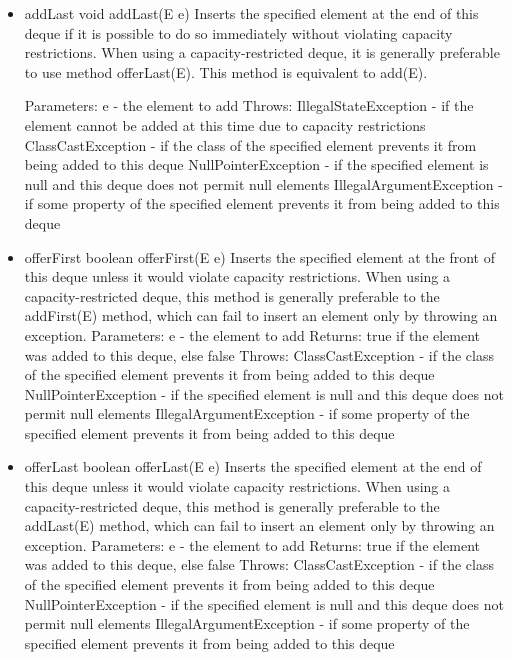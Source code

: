 \documentclass{book}
\begin{document}
\begin{itemize} 
	\item addLast
	void addLast(E e)
	Inserts the specified element at the end of this deque if it is possible to do so immediately without violating capacity restrictions. When using a capacity-restricted deque, it is generally preferable to use method offerLast(E).
	This method is equivalent to add(E).
	
	Parameters:
	e - the element to add
	Throws:
	IllegalStateException - if the element cannot be added at this time due to capacity restrictions
	ClassCastException - if the class of the specified element prevents it from being added to this deque
	NullPointerException - if the specified element is null and this deque does not permit null elements
	IllegalArgumentException - if some property of the specified element prevents it from being added to this deque
	
	\item offerFirst
	boolean offerFirst(E e)
	Inserts the specified element at the front of this deque unless it would violate capacity restrictions. When using a capacity-restricted deque, this method is generally preferable to the addFirst(E) method, which can fail to insert an element only by throwing an exception.
	Parameters:
	e - the element to add
	Returns:
	true if the element was added to this deque, else false
	Throws:
	ClassCastException - if the class of the specified element prevents it from being added to this deque
	NullPointerException - if the specified element is null and this deque does not permit null elements
	IllegalArgumentException - if some property of the specified element prevents it from being added to this deque
	
	\item offerLast
	boolean offerLast(E e)
	Inserts the specified element at the end of this deque unless it would violate capacity restrictions. When using a capacity-restricted deque, this method is generally preferable to the addLast(E) method, which can fail to insert an element only by throwing an exception.
	Parameters:
	e - the element to add
	Returns:
	true if the element was added to this deque, else false
	Throws:
	ClassCastException - if the class of the specified element prevents it from being added to this deque
	NullPointerException - if the specified element is null and this deque does not permit null elements
	IllegalArgumentException - if some property of the specified element prevents it from being added to this deque
	

\end{itemize}
\end{document}

